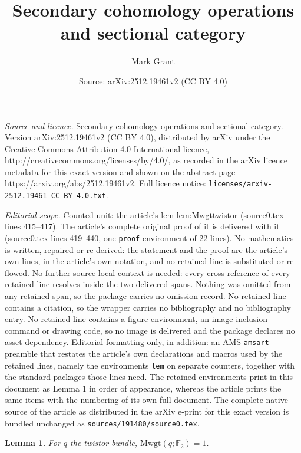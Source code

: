 \documentclass[10pt,a4paper]{amsart}
\title{Secondary cohomology operations and sectional category}
\author{Mark Grant}
\date{Source: arXiv:2512.19461v2 (CC BY 4.0)}
\newtheorem{lem}{Lemma}
\newcommand{\F}{\mathbb{F}}
\def\Mwgt{\mathrm{Mwgt}}
\begin{document}
\maketitle

\noindent\emph{Source and licence.} Secondary cohomology operations and sectional category. Version arXiv:2512.19461v2 (CC BY 4.0), distributed by arXiv under the Creative Commons Attribution 4.0 International licence, http://creativecommons.org/licenses/by/4.0/, as recorded in the arXiv licence metadata for this exact version and shown on the abstract page https://arxiv.org/abs/2512.19461v2. Full licence notice: \texttt{licenses/arxiv-2512.19461-CC-BY-4.0.txt}.\par\smallskip

\noindent\textit{Editorial scope.} Counted unit: the article's lem lem:Mwgttwistor (source0.tex lines 415--417). The article's complete original proof of it is delivered with it (source0.tex lines 419--440, one \texttt{proof} environment of 22 lines). No mathematics is written, repaired or re-derived: the statement and the proof are the article's own lines, in the article's own notation, and no retained line is substituted or re-flowed.  No further source-local context is needed: every cross-reference of every retained line resolves inside the two delivered spans.  Nothing was omitted from any retained span, so the package carries no omission record.  No retained line contains a citation, so the wrapper carries no bibliography and no bibliography entry.  No retained line contains a figure environment, an image-inclusion command or drawing code, so no image is delivered and the package declares no asset dependency.  Editorial formatting only, in addition: an AMS \texttt{amsart} preamble that restates the article's own declarations and macros used by the retained lines, namely the environments \texttt{lem} on separate counters, together with the standard packages those lines need.  The retained environments print in this document as Lemma 1 in order of appearance, whereas the article prints the same items with the numbering of its own full document.  The complete native source of the article as distributed in the arXiv e-print for this exact version is bundled unchanged as \texttt{sources/191480/source0.tex}.
\begin{lem}\label{lem:Mwgttwistor}
For $q$ the twistor bundle, $\Mwgt(q;\F_2)=1$.
\end{lem}
\end{document}
